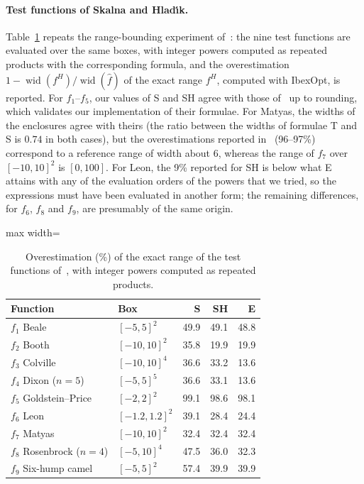 \documentclass[10pt]{article}
\theoremstyle{definition}
\newcommand{\wid}{\operatorname{wid}}
\begin{document}


\paragraph{Test functions of Skalna and Hlad\'{\i}k.} Table~\ref{tab:sh} repeats the range-bounding experiment of~\cite[Table~3]{skalna2017new}: the nine test functions are evaluated over the same boxes, with integer powers computed as repeated products with the corresponding formula, and the overestimation $1-\wid(f^H)/\wid(\hat f)$ of the exact range $f^H$, computed with IbexOpt, is reported. For $f_1$--$f_5$, our values of S and SH agree with those of~\cite{skalna2017new} up to rounding, which validates our implementation of their formulae. For Matyas, the widths of the enclosures agree with theirs (the ratio between the widths of formulae T and S is $0.74$ in both cases), but the overestimations reported in~\cite{skalna2017new} (96--97\%) correspond to a reference range of width about 6, whereas the range of $f_7$ over $[-10,10]^2$ is $[0,100]$. For Leon, the 9\% reported for SH is below what E attains with any of the evaluation orders of the powers that we tried, so the expressions must have been evaluated in another form; the remaining differences, for $f_6$, $f_8$ and $f_9$, are presumably of the same origin.

\begin{table}[H]
\centering
\caption{Overestimation (\%) of the exact range of the test functions of~\cite{skalna2017new}, with integer powers computed as repeated products.}
\label{tab:sh}
\small
\begin{adjustbox}{max width=\linewidth}\begin{tabular}{llrrr}
\toprule
Function & Box & S & SH & E \\
\midrule
$f_1$ Beale & $[-5,5]^2$ & 49.9 & 49.1 & 48.8 \\
$f_2$ Booth & $[-10,10]^2$ & 35.8 & 19.9 & 19.9 \\
$f_3$ Colville & $[-10,10]^4$ & 36.6 & 33.2 & 13.6 \\
$f_4$ Dixon ($n=5$) & $[-5,5]^5$ & 36.6 & 33.1 & 13.6 \\
$f_5$ Goldstein--Price & $[-2,2]^2$ & 99.1 & 98.6 & 98.1 \\
$f_6$ Leon & $[-1.2,1.2]^2$ & 39.1 & 28.4 & 24.4 \\
$f_7$ Matyas & $[-10,10]^2$ & 32.4 & 32.4 & 32.4 \\
$f_8$ Rosenbrock ($n=4$) & $[-5,10]^4$ & 47.5 & 36.0 & 32.3 \\
$f_9$ Six-hump camel & $[-5,5]^2$ & 57.4 & 39.9 & 39.9 \\
\bottomrule
\end{tabular}\end{adjustbox}
\end{table}
\end{document}
